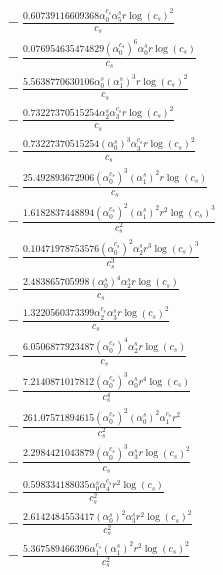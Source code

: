 \documentclass[10pt]{article}
\begin{document}
\begin{align*}
&{}  - \frac{0.60739116609368 \alpha_{0}^{c_s} \alpha_{5}^s r \log{\left(c_{s} \right)}^{2}}{c_{s}} \\
&{}  - \frac{0.076954635474829 \left(\alpha_{0}^{c_s}\right)^{6} \alpha_{0}^s r \log{\left(c_{s} \right)}}{c_{s}} \\
&{}  - \frac{5.5638770630106 \alpha_{0}^s \left(\alpha_{1}^s\right)^{3} r \log{\left(c_{s} \right)}^{2}}{c_{s}} \\
&{}  - \frac{0.73227370515254 \alpha_{2}^s \alpha_{3}^{c_s} r \log{\left(c_{s} \right)}^{2}}{c_{s}} \\
&{}  - \frac{0.73227370515254 \left(\alpha_{0}^s\right)^{3} \alpha_{3}^{c_s} r \log{\left(c_{s} \right)}^{2}}{c_{s}} \\
&{}  - \frac{25.492893672906 \left(\alpha_{0}^{c_s}\right)^{3} \left(\alpha_{1}^s\right)^{2} r \log{\left(c_{s} \right)}}{c_{s}} \\
&{}  - \frac{1.6182837448894 \left(\alpha_{0}^{c_s}\right)^{2} \left(\alpha_{1}^s\right)^{2} r^{2} \log{\left(c_{s} \right)}^{3}}{c_{s}^{2}} \\
&{}  - \frac{0.10471978753576 \left(\alpha_{0}^{c_s}\right)^{2} \alpha_{2}^s r^{3} \log{\left(c_{s} \right)}^{3}}{c_{s}^{3}} \\
&{}  - \frac{2.483865705998 \left(\alpha_{0}^s\right)^{4} \alpha_{2}^s r \log{\left(c_{s} \right)}}{c_{s}} \\
&{}  - \frac{1.3220560373399 \alpha_{2}^{c_s} \alpha_{3}^s r \log{\left(c_{s} \right)}^{2}}{c_{s}} \\
&{}  - \frac{6.0506877923487 \left(\alpha_{0}^{c_s}\right)^{4} \alpha_{2}^s r \log{\left(c_{s} \right)}}{c_{s}} \\
&{}  - \frac{7.2140871017812 \left(\alpha_{0}^{c_s}\right)^{3} \alpha_{0}^s r^{4} \log{\left(c_{s} \right)}}{c_{s}^{4}} \\
&{}  - \frac{261.07571894615 \left(\alpha_{0}^{c_s}\right)^{2} \left(\alpha_{0}^s\right)^{2} \alpha_{1}^{c_s} r^{2}}{c_{s}^{2}} \\
&{}  - \frac{2.2984421043879 \left(\alpha_{0}^{c_s}\right)^{3} \alpha_{3}^s r \log{\left(c_{s} \right)}^{2}}{c_{s}} \\
&{}  - \frac{0.598334188035 \alpha_{0}^s \alpha_{4}^{c_s} r^{2} \log{\left(c_{s} \right)}}{c_{s}^{2}} \\
&{}  - \frac{2.6142484553417 \left(\alpha_{0}^s\right)^{2} \alpha_{3}^s r^{2} \log{\left(c_{s} \right)}^{2}}{c_{s}^{2}} \\
&{}  - \frac{5.367589466396 \alpha_{1}^{c_s} \left(\alpha_{1}^s\right)^{2} r^{2} \log{\left(c_{s} \right)}^{2}}{c_{s}^{2}} \\

\end{align*}
\end{document}
